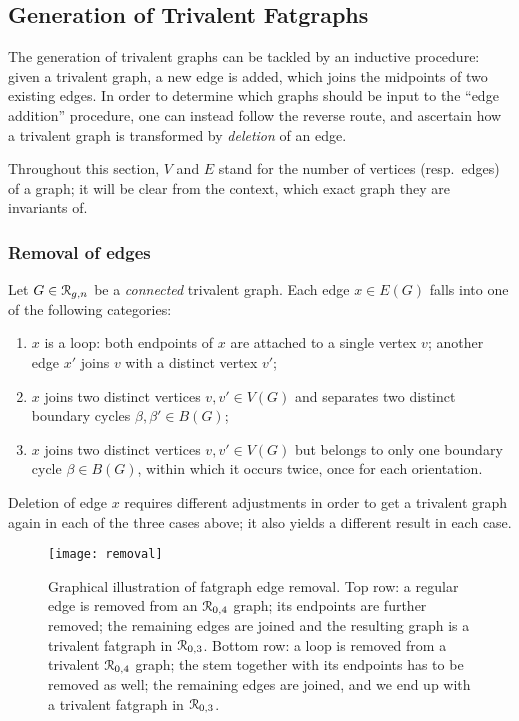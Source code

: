 \subsection{Generation of Trivalent Fatgraphs}
\label{sec:stage1-trivalent}

The generation of trivalent graphs can be tackled by an inductive
procedure: given a trivalent graph, a new edge is added, which joins
the midpoints of two existing edges.  
In order to determine which graphs should be input to the ``edge
addition'' procedure, one can instead follow the reverse route, and
ascertain how a trivalent graph is transformed by \emph{deletion} of
an edge.

Throughout this section, $V$ and $E$ stand for the number of vertices
(resp.~edges) of a graph; it will be clear from the context, which
exact graph they are invariants of.

\subsubsection{Removal of edges}
\label{sec:removal}

Let $G \in \mathcal{R}_{g,n}$ be a \emph{connected} trivalent graph. Each edge
$x \in E(G)$ falls into one of the following categories:
\begin{enumerate}[\slshape A)]
\item $x$ is a loop: both endpoints of $x$ are
  attached to a single vertex $v$; another edge $x'$ joins $v$ with a
  distinct vertex $v'$;
\item $x$ joins two distinct vertices $v, v'
  \in V(G)$ and separates two distinct boundary cycles $\beta, \beta'
  \in B(G)$;
\item $x$ joins two distinct vertices $v, v'
  \in V(G)$ but belongs to only one boundary cycle $\beta \in B(G)$,
  within which it occurs twice, once for each orientation.
\end{enumerate}
Deletion of edge $x$ requires different adjustments in order to get a
trivalent graph again in each of the three cases above; it also yields
a different result in each case.
\begin{figure}
  \centering
  \texttt{[image: removal]}
  \caption{Graphical illustration of fatgraph edge removal.  Top row: a regular edge is removed from an $\mathcal{R}_{0,4}$ graph; its endpoints are further removed; the remaining edges are joined and the resulting graph is a trivalent fatgraph in $\mathcal{R}_{0,3}$.  Bottom row: a loop is removed from a trivalent $\mathcal{R}_{0,4}$ graph; the stem together with its endpoints has to be removed as well; the remaining edges are joined, and we end up with a trivalent fatgraph in $\mathcal{R}_{0,3}$.}
  \label{fig:removal}
\end{figure}

